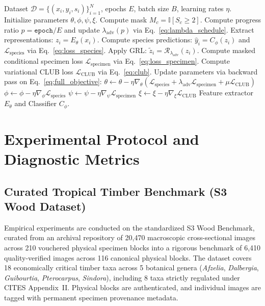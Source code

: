 \documentclass[a4paper,fleqn]{cas-sc}
\begin{document}
\begin{algorithm}[t]
\caption{Specimen-Invariant Wood Representation Learning}
\label{alg:training}
\begin{algorithmic}[1]
\Require Dataset $\mathcal{D} = \{(x_i, y_i, s_i)\}_{i=1}^N$, epochs $E$, batch size $B$, learning rates $\eta$.
\State Initialize parameters $\theta, \phi, \psi, \xi$. Compute mask $M_c = \mathbb{I}[S_c \ge 2]$.
    \State Compute progress ratio $p = \texttt{epoch} / E$ and update $\lambda_{\text{adv}}(p)$ via Eq.~\eqref{eq:lambda_schedule}.
        \State Extract representations: $z_i = E_\theta(x_i)$.
        \State Compute species predictions: $\hat{y}_i = C_\phi(z_i)$ and $\mathcal{L}_{\text{species}}$ via Eq.~\eqref{eq:loss_species}.
        \State Apply GRL: $\tilde{z}_i = \mathcal{R}_{\lambda_{\text{adv}}}(z_i)$.
        \State Compute masked conditional specimen loss $\mathcal{L}_{\text{specimen}}$ via Eq.~\eqref{eq:loss_specimen}.
        \State Compute variational CLUB loss $\mathcal{L}_{\text{CLUB}}$ via Eq.~\eqref{eq:club}.
        \State Update parameters via backward pass on Eq.~\eqref{eq:full_objective}:
        \State $\theta \gets \theta - \eta \nabla_\theta (\mathcal{L}_{\text{species}} + \lambda_{\text{adv}} \mathcal{L}_{\text{specimen}} + \mu \mathcal{L}_{\text{CLUB}})$
        \State $\phi \gets \phi - \eta \nabla_\phi \mathcal{L}_{\text{species}}$
        \State $\psi \gets \psi - \eta \nabla_\psi \mathcal{L}_{\text{specimen}}$
        \State $\xi \gets \xi - \eta \nabla_\xi \mathcal{L}_{\text{CLUB}}$
    \EndFor
\EndFor
\State \Return Feature extractor $E_\theta$ and Classifier $C_\phi$.
\end{algorithmic}
\end{algorithm}

\section{Experimental Protocol and Diagnostic Metrics}
\label{sec:protocol}

\subsection{Curated Tropical Timber Benchmark (S3 Wood Dataset)}
Empirical experiments are conducted on the standardized S3 Wood Benchmark, curated from an archival repository of 20,470 macroscopic cross-sectional images across 210 vouchered physical specimen blocks into a rigorous benchmark of 6,410 quality-verified images across 116 canonical physical blocks. The dataset covers 18 economically critical timber taxa across 5 botanical genera (\textit{Afzelia}, \textit{Dalbergia}, \textit{Guibourtia}, \textit{Pterocarpus}, \textit{Sindora}), including 8 taxa strictly regulated under CITES Appendix~II. Physical blocks are authenticated, and individual images are tagged with permanent specimen provenance metadata.
\end{document}
